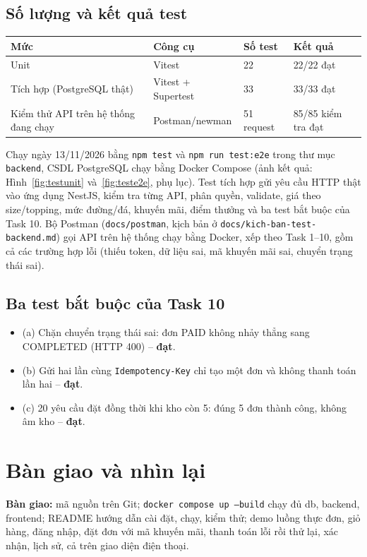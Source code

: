 \documentclass[a4paper]{article}
\begin{document}
\subsection{Số lượng và kết quả test}
\begin{center}
\small\everymath{}
\begin{tabular}{@{}p{4.2cm}p{2.2cm}p{1.8cm}p{5.0cm}@{}}
\toprule
\textbf{Mức} & \textbf{Công cụ} & \textbf{Số test} & \textbf{Kết quả} \\ \midrule
Unit & Vitest & 22 & 22/22 đạt \\
Tích hợp (PostgreSQL thật) & Vitest + Supertest & 33 & 33/33 đạt \\
Kiểm thử API trên hệ thống đang chạy & Postman/newman & 51 request & 85/85 kiểm tra đạt \\
\bottomrule
\end{tabular}
\end{center}
Chạy ngày 13/11/2026 bằng \texttt{npm test} và \texttt{npm run test:e2e} trong thư mục \texttt{backend}, CSDL PostgreSQL chạy bằng Docker Compose (ảnh kết quả: Hình~\ref{fig:testunit} và~\ref{fig:teste2e}, phụ lục). Test tích hợp gửi yêu cầu HTTP thật vào ứng dụng NestJS, kiểm tra từng API, phân quyền, validate, giá theo size/topping, mức đường/đá, khuyến mãi, điểm thưởng và ba test bắt buộc của Task 10. Bộ Postman (\texttt{docs/postman}, kịch bản ở \texttt{docs/kich-ban-test-backend.md}) gọi API trên hệ thống chạy bằng Docker, xếp theo Task 1--10, gồm cả các trường hợp lỗi (thiếu token, dữ liệu sai, mã khuyến mãi sai, chuyển trạng thái sai).

\subsection{Ba test bắt buộc của Task 10}
\begin{itemize}\setlength{\itemsep}{0pt}\setlength{\parskip}{0pt}
    \item (a) Chặn chuyển trạng thái sai: đơn PAID không nhảy thẳng sang COMPLETED (HTTP 400) -- \textbf{đạt}.
    \item (b) Gửi hai lần cùng \texttt{Idempotency-Key} chỉ tạo một đơn và không thanh toán lần hai -- \textbf{đạt}.
    \item (c) 20 yêu cầu đặt đồng thời khi kho còn 5: đúng 5 đơn thành công, không âm kho -- \textbf{đạt}.
\end{itemize}

\section{Bàn giao và nhìn lại}
\textbf{Bàn giao:} mã nguồn trên Git; \texttt{docker compose up --build} chạy đủ db, backend, frontend; README hướng dẫn cài đặt, chạy, kiểm thử; demo luồng thực đơn, giỏ hàng, đăng nhập, đặt đơn với mã khuyến mãi, thanh toán lỗi rồi thử lại, xác nhận, lịch sử, cả trên giao diện điện thoại.
\end{document}
